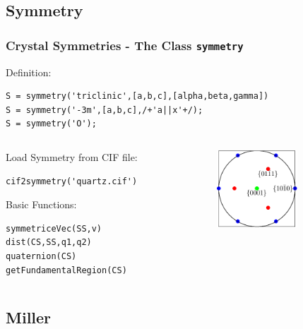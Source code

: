 \subsection*{Symmetry}
\begin{frame}[fragile]
  \frametitle{Crystal Symmetries - The \MTEX Class \texttt{\bf symmetry}}

  Definition:

\begin{lstlisting}
S = symmetry('triclinic',[a,b,c],[alpha,beta,gamma])
S = symmetry('-3m',[a,b,c],/+'a||x'+/);
S = symmetry('O');
\end{lstlisting}

\medskip

\begin{columns}
  \begin{column}{8.5cm}

Load Symmetry from CIF file:

\begin{lstlisting}
cif2symmetry('quartz.cif')
\end{lstlisting}

\medskip

    Basic Functions:

\begin{lstlisting}
symmetriceVec(SS,v)
dist(CS,SS,q1,q2)
quaternion(CS)
getFundamentalRegion(CS)
\end{lstlisting}
  \end{column}

  \begin{column}{3cm}
    \includegraphics[width=3cm]{pic/sym}
  \end{column}

\end{columns}

\end{frame}

\subsection*{Miller}

